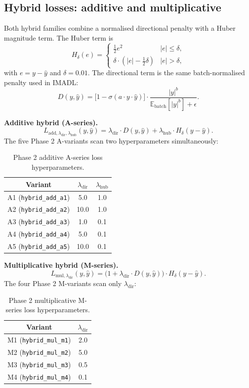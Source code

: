 \subsection{Hybrid losses: additive and multiplicative}

\label{subsec:hybrid-losses}

Both hybrid families combine a normalised directional penalty with a Huber magnitude term. The Huber term is
\[
H_\delta(e) =
\begin{cases}
\tfrac12 e^2 & |e| \le \delta, \\
\delta \cdot (|e| - \tfrac12 \delta) & |e| > \delta,
\end{cases}
\]
with $e = y - \hat y$ and $\delta = 0.01$. The directional term is the same batch-normalised penalty used in IMADL:
\[
D(y, \hat y) = \big[1 - \sigma(a \cdot y \cdot \hat y)\big] \cdot \frac{|y|^b}{\mathbb{E}_{\text{batch}}[|y|^b] + \epsilon}.
\]

\textbf{Additive hybrid (A-series).}
\[
L_{\mathrm{add}, \lambda_{\mathrm{dir}}, \lambda_{\mathrm{hub}}}(y, \hat y)
= \lambda_{\mathrm{dir}} \cdot D(y, \hat y) + \lambda_{\mathrm{hub}} \cdot H_\delta(y - \hat y).
\]
The five Phase 2 A-variants scan two hyperparameters simultaneously:

\begin{table}[H]
\centering
\caption{Phase 2 additive A-series loss hyperparameters.}
\label{tab:a-series-hyperparameters}
\begin{tabular}{ccc}
\toprule
Variant & $\lambda_{\mathrm{dir}}$ & $\lambda_{\mathrm{hub}}$ \\
\midrule
A1 (\texttt{hybrid\_add\_a1}) & 5.0 & 1.0 \\
A2 (\texttt{hybrid\_add\_a2}) & 10.0 & 1.0 \\
A3 (\texttt{hybrid\_add\_a3}) & 1.0 & 0.1 \\
A4 (\texttt{hybrid\_add\_a4}) & 5.0 & 0.1 \\
A5 (\texttt{hybrid\_add\_a5}) & 10.0 & 0.1 \\
\bottomrule
\end{tabular}
\end{table}

\textbf{Multiplicative hybrid (M-series).}
\[
L_{\mathrm{mul}, \lambda_{\mathrm{dir}}}(y, \hat y)
= \big(1 + \lambda_{\mathrm{dir}} \cdot D(y, \hat y)\big) \cdot H_\delta(y - \hat y).
\]
The four Phase 2 M-variants scan only $\lambda_{\mathrm{dir}}$:

\begin{table}[H]
\centering
\caption{Phase 2 multiplicative M-series loss hyperparameters.}
\label{tab:m-series-hyperparameters}
\begin{tabular}{cc}
\toprule
Variant & $\lambda_{\mathrm{dir}}$ \\
\midrule
M1 (\texttt{hybrid\_mul\_m1}) & 2.0 \\
M2 (\texttt{hybrid\_mul\_m2}) & 5.0 \\
M3 (\texttt{hybrid\_mul\_m3}) & 0.5 \\
M4 (\texttt{hybrid\_mul\_m4}) & 0.1 \\
\bottomrule
\end{tabular}
\end{table}


